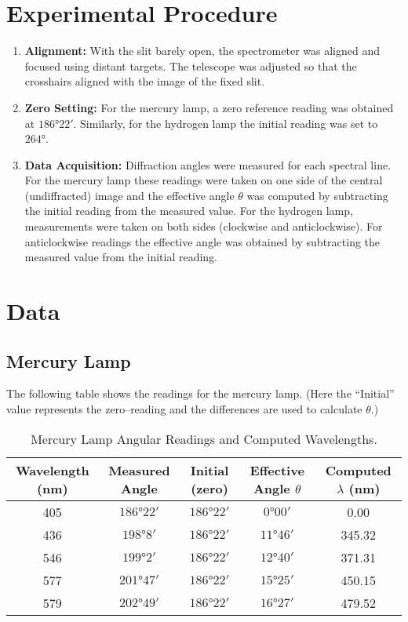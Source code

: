 \documentclass[12pt]{article}
\begin{document}
\section{Experimental Procedure}
\begin{enumerate}
  \item \textbf{Alignment:} With the slit barely open, the spectrometer was aligned and focused using distant targets. The telescope was adjusted so that the crosshairs aligned with the image of the fixed slit.
  \item \textbf{Zero Setting:} For the mercury lamp, a zero reference reading was obtained at \(\ang{186;22}\). Similarly, for the hydrogen lamp the initial reading was set to \(\ang{264}\).
  \item \textbf{Data Acquisition:} Diffraction angles were measured for each spectral line. For the mercury lamp these readings were taken on one side of the central (undiffracted) image and the effective angle \(\theta\) was computed by subtracting the initial reading from the measured value. For the hydrogen lamp, measurements were taken on both sides (clockwise and anticlockwise). For anticlockwise readings the effective angle was obtained by subtracting the measured value from the initial reading.
\end{enumerate}

\section{Data}
\subsection{Mercury Lamp}
The following table shows the readings for the mercury lamp. (Here the ``Initial'' value represents the zero–reading and the differences are used to calculate \(\theta\).)
\bigskip

\begin{table}[H]
  \centering
  \caption{Mercury Lamp Angular Readings and Computed Wavelengths.}
  \begin{tabular}{ccccc}
    \toprule
    Wavelength (nm) & Measured Angle & Initial (zero) & Effective Angle \(\theta\) & Computed \(\lambda\) (nm) \\
    \midrule
    405 & \(\ang{186;22}\) & \(\ang{186;22}\) & \(\ang{0;00}\) & 0.00 \\
    436 & \(\ang{198;8}\)  & \(\ang{186;22}\) & \(\ang{11;46}\) & 345.32 \\
    546 & \(\ang{199;2}\)  & \(\ang{186;22}\) & \(\ang{12;40}\) & 371.31 \\
    577 & \(\ang{201;47}\) & \(\ang{186;22}\) & \(\ang{15;25}\) & 450.15 \\
    579 & \(\ang{202;49}\) & \(\ang{186;22}\) & \(\ang{16;27}\) & 479.52 \\
    \bottomrule
  \end{tabular}
  \label{tab:mercury}
\end{table}
\end{document}

